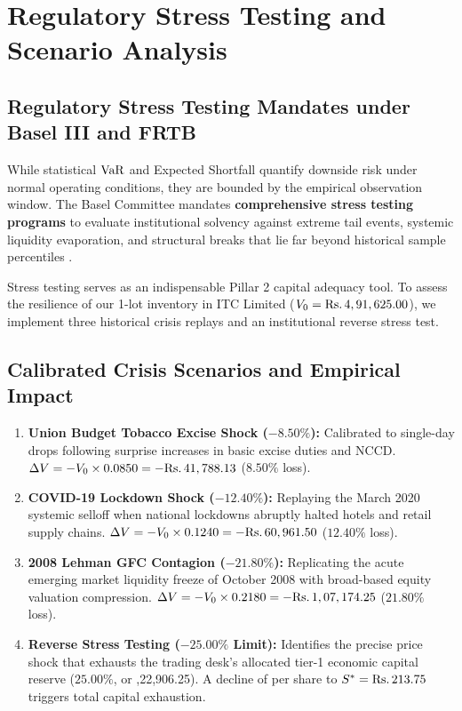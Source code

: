 
\section{Regulatory Stress Testing and Scenario Analysis}
\label{sec:stress_testing}

\subsection{Regulatory Stress Testing Mandates under Basel III and FRTB}

While statistical $\operatorname{VaR}$ and Expected Shortfall quantify downside risk under normal operating conditions, they are bounded by the empirical observation window. The Basel Committee mandates \textbf{comprehensive stress testing programs} to evaluate institutional solvency against extreme tail events, systemic liquidity evaporation, and structural breaks that lie far beyond historical sample percentiles \citep{bcbs2019frtb}.

Stress testing serves as an indispensable Pillar 2 capital adequacy tool. To assess the resilience of our 1-lot inventory in ITC Limited ($V_0 = \text{\text{Rs.}\,}4,91,625.00$), we implement three historical crisis replays and an institutional reverse stress test.

\subsection{Calibrated Crisis Scenarios and Empirical Impact}

\begin{enumerate}[leftmargin=1.2em, itemsep=0.5pt, parsep=0pt, label=\textbf{\arabic*.}]
    \item \textbf{Union Budget Tobacco Excise Shock ($-8.50\%$):} Calibrated to single-day drops following surprise increases in basic excise duties and NCCD. $\Delta V = -V_0 \times 0.0850 = -\text{\text{Rs.}\,}41,788.13$ ($8.50\%$ loss).
    \item \textbf{COVID-19 Lockdown Shock ($-12.40\%$):} Replaying the March 2020 systemic selloff when national lockdowns abruptly halted hotels and retail supply chains. $\Delta V = -V_0 \times 0.1240 = -\text{\text{Rs.}\,}60,961.50$ ($12.40\%$ loss).
    \item \textbf{2008 Lehman GFC Contagion ($-21.80\%$):} Replicating the acute emerging market liquidity freeze of October 2008 with broad-based equity valuation compression. $\Delta V = -V_0 \times 0.2180 = -\text{\text{Rs.}\,}1,07,174.25$ ($21.80\%$ loss).
    \item \textbf{Reverse Stress Testing ($-25.00\%$ Limit):} Identifies the precise price shock that exhausts the trading desk's allocated tier-1 economic capital reserve ($25.00\%$, or ,22,906.25). A decline of  per share to $S^* = \text{\text{Rs.}\,}213.75$ triggers total capital exhaustion.
\end{enumerate}

